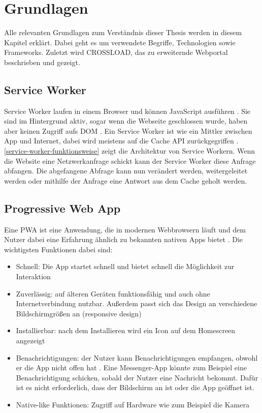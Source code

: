 \chapter{Grundlagen}
\label{Kap2}

Alle relevanten Grundlagen zum Verständnis dieser Thesis werden in diesem Kapitel erklärt. Dabei geht es um verwendete Begriffe, Technologien sowie Frameworks. Zuletzt wird CROSSLOAD, das zu erweiternde Webportal beschrieben und gezeigt.

\section{Service Worker}
Service Worker laufen in einem Browser und können JavaScript ausführen \autocite{Sheppard2017}. Sie sind im Hintergrund aktiv, sogar wenn die Webseite geschlossen wurde, haben aber keinen Zugriff aufs \ac{DOM} \autocite{Sheppard2017}. Ein Service Worker ist wie ein Mittler zwischen App und Internet, dabei wird meistens auf die Cache \ac{API} zurückgegriffen \autocite{Sheppard2017}. \autoref{service-worker-funktionsweise} zeigt die Architektur von Service Workern. Wenn die Website eine Netzwerkanfrage schickt kann der Service Worker diese Anfrage abfangen. Die abgefangene Abfrage kann nun verändert werden, weitergeleitet werden oder mithilfe der Anfrage eine Antwort aus dem Cache geholt werden.


\section{Progressive Web App}
Eine \ac{PWA} ist eine Anwendung, die in modernen Webbrowsern läuft und dem Nutzer dabei eine Erfahrung ähnlich zu bekannten nativen Apps bietet \autocite{Sheppard2017} \autocite{Rojas2020}. Die wichtigsten Funktionen dabei sind:

\begin{itemize}
  \item Schnell: Die App startet schnell und bietet schnell die Möglichkeit zur Interaktion \autocite{Hajian2019} \autocite{Sheppard2017}
  \item Zuverlässig: auf älteren Geräten funktionsfähig und auch ohne Internetverbindung nutzbar. Außerdem passt sich das Design an verschiedene Bildschirmgrößen an (responsive design) \autocite{Hajian2019} \autocite{Sheppard2017}
  \item Installierbar: nach dem Installieren wird ein Icon auf dem Homescreen angezeigt \autocite{Hajian2019} \autocite{Sheppard2017} \autocite{Rojas2020}
  \item Benachrichtigungen: der Nutzer kann Benachrichtigungen empfangen, obwohl er die App nicht offen hat \autocite{Hajian2019} \autocite{Sheppard2017}. Eine Messenger-App könnte zum Beispiel eine Benachrichtigung schicken, sobald der Nutzer eine Nachricht bekommt. Dafür ist es nicht erforderlich, dass der Bildschirm an ist oder die App geöffnet ist.
  \item Native-like Funktionen: Zugriff auf Hardware wie zum Beispiel die Kamera \autocite{Hajian2019}
\end{itemize}

